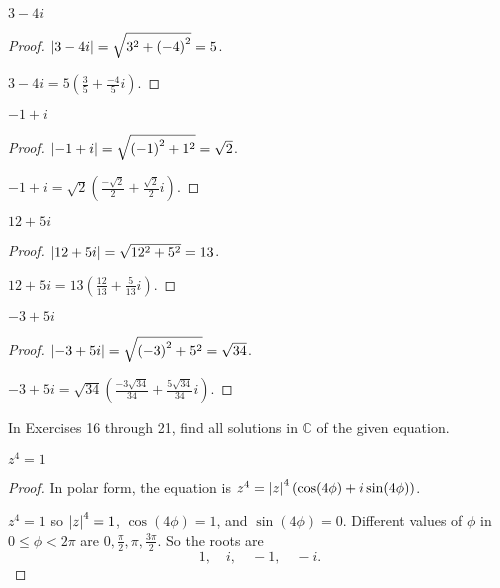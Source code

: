 \begin{exercise}
    $3 - 4i$
\end{exercise}

\begin{proof}
    $\left\vert{3 - 4i}\right\vert = \sqrt{3^{2} + {(-4)}^{2}} = 5$.

    $3 - 4i = 5\left(\frac{3}{5} + \frac{-4}{5}i\right)$.
\end{proof}

\begin{exercise}
    $-1 + i$
\end{exercise}

\begin{proof}
    $\left\vert{-1 + i}\right\vert = \sqrt{{(-1)}^{2} + 1^{2}} = \sqrt{2}$.

    $-1 + i = \sqrt{2}\left(\frac{-\sqrt{2}}{2} + \frac{\sqrt{2}}{2}i\right)$.
\end{proof}

\begin{exercise}
    $12 + 5i$
\end{exercise}

\begin{proof}
    $\left\vert{12 + 5i}\right\vert = \sqrt{12^{2} + 5^{2}} = 13$.

    $12 + 5i = 13\left( \frac{12}{13} + \frac{5}{13}i \right)$.
\end{proof}

\begin{exercise}
    $-3 + 5i$
\end{exercise}

\begin{proof}
    $\left\vert{-3 + 5i}\right\vert = \sqrt{{(-3)}^{2} + 5^{2}} = \sqrt{34}$.

    $-3 + 5i = \sqrt{34}\left( \frac{-3\sqrt{34}}{34} + \frac{5\sqrt{34}}{34}i \right)$.
\end{proof}

In Exercises 16 through 21, find all solutions in $\mathbb{C}$ of the given equation.

\begin{exercise}
    $z^{4} = 1$
\end{exercise}

\begin{proof}
    In polar form, the equation is $z^{4} = \left\vert{z}\right\vert^{4}(\cos (4\phi) + i\sin (4\phi))$.

    $z^{4} = 1$ so $\left\vert{z}\right\vert^{4} = 1$, $\cos(4\phi) = 1$, and $\sin(4\phi) = 0$. Different values of $\phi$ in $0\le \phi < 2\pi$ are $0, \frac{\pi}{2}, \pi, \frac{3\pi}{2}$. So the roots are
    \[
        1,\quad i,\quad -1,\quad -i.
    \]
\end{proof}

